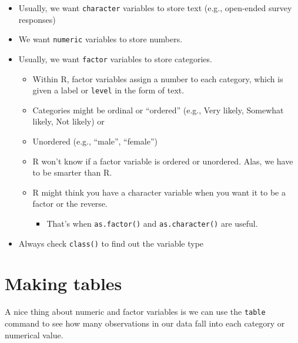 \documentclass[
  letterpaper,
  DIV=11,
  numbers=noendperiod]{scrreprt}
\newenvironment{Shaded}{\begin{snugshade}}{\end{snugshade}}
\newcommand{\DocumentationTok}[1]{\textcolor[rgb]{0.37,0.37,0.37}{\textit{#1}}}
\newcommand{\FunctionTok}[1]{\textcolor[rgb]{0.28,0.35,0.67}{#1}}
\newcommand{\NormalTok}[1]{\textcolor[rgb]{0.00,0.23,0.31}{#1}}
\newcommand{\SpecialCharTok}[1]{\textcolor[rgb]{0.37,0.37,0.37}{#1}}
\providecommand{\tightlist}{%
  \setlength{\itemsep}{0pt}\setlength{\parskip}{0pt}}\usepackage{longtable,booktabs,array}
\begin{document}
\begin{itemize}
\tightlist
\item
  Usually, we want \texttt{character} variables to store text (e.g.,
  open-ended survey responses)
\item
  We want \texttt{numeric} variables to store numbers.
\item
  Usually, we want \texttt{factor} variables to store categories.

  \begin{itemize}
  \tightlist
  \item
    Within R, factor variables assign a number to each category, which
    is given a label or \texttt{level} in the form of text.
  \item
    Categories might be ordinal or ``ordered'' (e.g., Very likely,
    Somewhat likely, Not likely) or
  \item
    Unordered (e.g., ``male'', ``female'')
  \item
    R won't know if a factor variable is ordered or unordered. Alas, we
    have to be smarter than R.
  \item
    R might think you have a character variable when you want it to be a
    factor or the reverse.

    \begin{itemize}
    \tightlist
    \item
      That's when \texttt{as.factor()} and \texttt{as.character()} are
      useful.
    \end{itemize}
  \end{itemize}
\item
  Always check \texttt{class()} to find out the variable type
\end{itemize}

\hypertarget{making-tables}{%
\section{Making tables}\label{making-tables}}

A nice thing about numeric and factor variables is we can use the
\texttt{table} command to see how many observations in our data fall
into each category or numerical value.

\begin{Shaded}
\end{Shaded}
\end{document}
